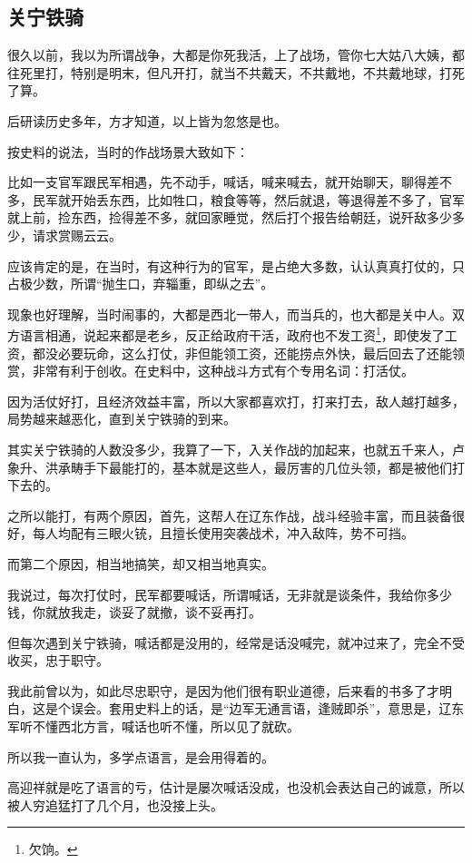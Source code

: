 \begin{multicols}{\theparacolNo}
\subsection{关宁铁骑}
很久以前，我以为所谓战争，大都是你死我活，上了战场，管你七大姑八大姨，都往死里打，特别是明末，但凡开打，就当不共戴天，不共戴地，不共戴地球，打死了算。

后研读历史多年，方才知道，以上皆为忽悠是也。

按史料的说法，当时的作战场景大致如下：

比如一支官军跟民军相遇，先不动手，喊话，喊来喊去，就开始聊天，聊得差不多，民军就开始丢东西，比如牲口，粮食等等，然后就退，等退得差不多了，官军就上前，捡东西，捡得差不多，就回家睡觉，然后打个报告给朝廷，说歼敌多少多少，请求赏赐云云。

应该肯定的是，在当时，有这种行为的官军，是占绝大多数，认认真真打仗的，只占极少数，所谓“抛生口，弃辎重，即纵之去”。

现象也好理解，当时闹事的，大都是西北一带人，而当兵的，也大都是关中人。双方语言相通，说起来都是老乡，反正给政府干活，政府也不发工资\footnote{欠饷。}，即使发了工资，都没必要玩命，这么打仗，非但能领工资，还能捞点外快，最后回去了还能领赏，非常有利于创收。在史料中，这种战斗方式有个专用名词：打活仗。

因为活仗好打，且经济效益丰富，所以大家都喜欢打，打来打去，敌人越打越多，局势越来越恶化，直到关宁铁骑的到来。

其实关宁铁骑的人数没多少，我算了一下，入关作战的加起来，也就五千来人，卢象升、洪承畴手下最能打的，基本就是这些人，最厉害的几位头领，都是被他们打下去的。

之所以能打，有两个原因，首先，这帮人在辽东作战，战斗经验丰富，而且装备很好，每人均配有三眼火铳，且擅长使用突袭战术，冲入敌阵，势不可挡。

而第二个原因，相当地搞笑，却又相当地真实。

我说过，每次打仗时，民军都要喊话，所谓喊话，无非就是谈条件，我给你多少钱，你就放我走，谈妥了就撤，谈不妥再打。

但每次遇到关宁铁骑，喊话都是没用的，经常是话没喊完，就冲过来了，完全不受收买，忠于职守。

我此前曾以为，如此尽忠职守，是因为他们很有职业道德，后来看的书多了才明白，这是个误会。套用史料上的话，是“边军无通言语，逢贼即杀”，意思是，辽东军听不懂西北方言，喊话也听不懂，所以见了就砍。

所以我一直认为，多学点语言，是会用得着的。

高迎祥就是吃了语言的亏，估计是屡次喊话没成，也没机会表达自己的诚意，所以被人穷追猛打了几个月，也没接上头。


\end{multicols}
